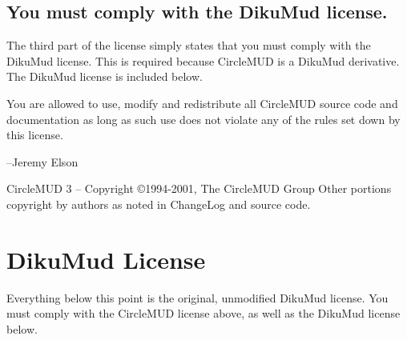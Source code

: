 \documentclass[11pt]{article}
\begin{document}
\subsection{You must comply with the DikuMud license.}   
The third part of the license simply states that you must comply with the DikuMud license.  This is required because CircleMUD is a DikuMud derivative. The DikuMud license is included below.
\par
You are allowed to use, modify and redistribute all CircleMUD source code and documentation as long as such use does not violate any of the rules set down by this license.
\par
--Jeremy Elson
\par
CircleMUD 3 -- Copyright \copyright 1994-2001, The CircleMUD Group\newline
Other portions copyright by authors as noted in ChangeLog and source code.

\section{DikuMud License}
Everything below this point is the original, unmodified DikuMud license. You must comply with the CircleMUD license above, as well as the DikuMud license below.
\end{document}
